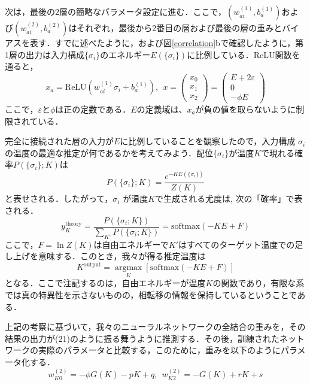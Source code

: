 \documentclass[a4paper,11pt]{jsarticle}
\begin{document}
次は，最後の2層の簡略なパラメータ設定に進む．ここで，$(w_{ai}^{(1)}, b_a^{(1)})$および$(w_{ai}^{(2)}, b_a^{(2)})$はそれぞれ，最後から2番目の層および最後の層の重みとバイアスを表す．すでに述べたように，および図\ref{correlation}bで確認したように，第1層の出力は入力構成$\{ \sigma_i \}$のエネルギー$E(\{ \sigma_i \})$に比例している．ReLU関数を通ると，
\begin{equation}
  x_a = \text{ReLU}(w_{ai}^{(1)}\sigma_i + b_a^{(1)}), \ \
  x = \begin{pmatrix} x_0 \\ x_1 \\ x_2 \end{pmatrix}
  = \begin{pmatrix} E+2\varepsilon \\ 0 \\ -\phi E \end{pmatrix}
\end{equation}
ここで，$\varepsilon$と$\phi$は正の定数である．$E$の定義域は、$x_a$が負の値を取らないように制限されている．\par
完全に接続された層の入力が$E$に比例していることを観察したので，入力構成 ${\sigma_i}$の温度の最適な推定が何であるかを考えてみよう．配位$\{ \sigma_i \}$が温度$K$で現れる確率$P(\{ \sigma_i \} ; K )$は
\begin{equation}
  P(\{ \sigma_i \} ; K ) = \frac{e^{-KE(\{ \sigma_i \})}}{Z(K)}
\end{equation}
と表せされる．したがって，${\sigma_i}$ が温度$K$で生成される尤度は,
次の「確率」で表される．
\begin{equation}
  y_K^{\text{theory}} = \frac{P(\{\sigma_i ; K \})}{\sum_{K'}P(\{\sigma_i ; K \})} = \text{softmax}(-KE + F)
\end{equation}
ここで，$F = \ln{Z(K)}$は自由エネルギーで$K'$はすべてのターゲット温度での足し上げを意味する．このとき，我々が得る推定温度は
\begin{equation}
  K^{\text{output}} =
  \underset{K} {\operatorname{argmax}} \left[\text{softmax}(-KE + F)\right]
\end{equation}
となる．ここで注記するのは，自由エネルギーが温度$K$の関数であり，有限な系では真の特異性を示さないものの，相転移の情報を保持しているということである．\par
上記の考察に基づいて，我々のニューラルネットワークの全結合の重みを，その結果の出力が(21)のように振る舞うように推測する．その後，訓練されたネットワークの実際のパラメータと比較する，このために，重みを以下のようにパラメータ化する．
\begin{equation}
  w_{K0}^{(2)} = -\phi G(K) - pK + q, \ \
  w_{K2}^{(2)} = -G(K) + rK + s
\end{equation}
\end{document}
